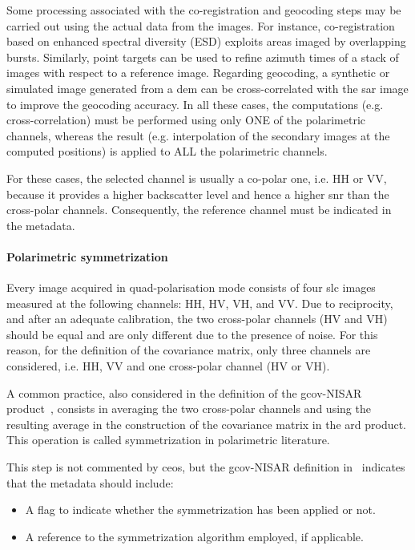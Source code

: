 Some processing associated with the co-registration and geocoding steps may be carried out using the actual data from the images. For instance, co-registration based on enhanced spectral diversity (ESD) exploits areas imaged by overlapping bursts. Similarly, point targets can be used to refine azimuth times of a stack of images with respect to a reference image. Regarding geocoding, a synthetic or simulated image generated from a \acs{dem} can be cross-correlated with the \acs{sar} image to improve the geocoding accuracy.
In all these cases, the computations (e.g. cross-correlation)  must be performed using only ONE of the polarimetric channels, whereas the result (e.g. interpolation of the secondary images at the computed positions) is applied to ALL the polarimetric channels.

For these cases, the selected channel is usually a co-polar one, i.e. HH or VV, because it provides a higher backscatter level and hence a higher \acs{snr} than the cross-polar channels. Consequently, the reference channel must be indicated in the metadata.

\paragraph*{Polarimetric symmetrization}

Every image acquired in quad-polarisation mode consists of four \acs{slc} images measured at the following channels: HH, HV, VH, and VV. Due to reciprocity, and after an adequate calibration, the two cross-polar channels (HV and VH) should be equal and are only different due to the presence of noise. For this reason, for the definition of the covariance matrix, only three channels are considered, i.e. HH, VV and one cross-polar channel (HV or VH). 

A common practice, also considered in the definition of the \acs{gcov}-NISAR product~\cite{NISAR_GCOV_ProdSpec}, consists in averaging the two cross-polar channels and using the resulting average in the construction of the covariance matrix in the \acs{ard} product. This operation is called symmetrization in polarimetric literature.

This step is not commented by \acs{ceos}, but the \acs{gcov}-NISAR definition in~\cite{NISAR_GCOV_ProdSpec} indicates that the metadata should include:
\begin{itemize}
\item A flag to indicate whether the symmetrization has been applied or not.
\item A reference to the symmetrization algorithm employed, if applicable.
\end{itemize}

